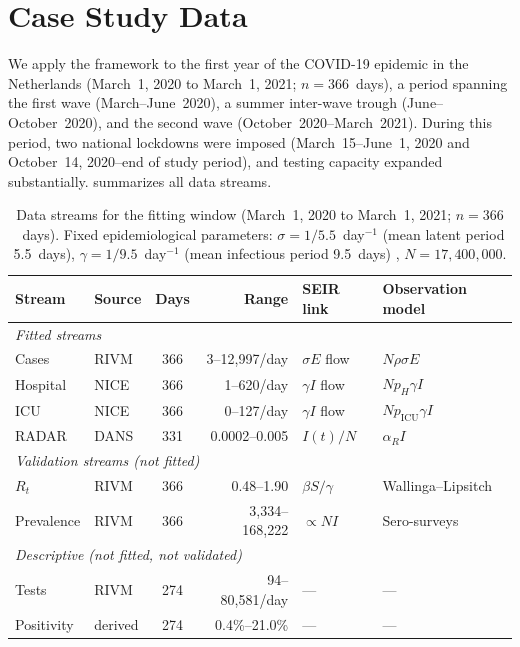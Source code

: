 \documentclass[11pt]{article}
\begin{document}
\section{Case Study Data}\label{sec:data}

We apply the framework to the first year of the COVID-19 epidemic in the Netherlands (March~1, 2020 to March~1, 2021; $n=366$~days), a period spanning the first wave (March--June~2020), a summer inter-wave trough (June--October~2020), and the second wave (October~2020--March~2021). During this period, two national lockdowns were imposed (March~15--June~1, 2020 and October~14, 2020--end of study period), and testing capacity expanded substantially.  summarizes all data streams.

\begin{table}[ht]
\centering\small
\caption{Data streams for the fitting window (March~1, 2020 to March~1, 2021; $n=366$~days). Fixed epidemiological parameters: $\sigma=1/5.5$~day$^{-1}$ (mean latent period 5.5~days), $\gamma=1/9.5$~day$^{-1}$ (mean infectious period 9.5~days) \citep{He2020,Byrne2020}, $N=17{,}400{,}000$.}
\label{tab:data}
\begin{tabular}{llcrll}
\toprule
Stream & Source & Days & Range & SEIR link & Observation model \\
\midrule
\multicolumn{6}{l}{\emph{Fitted streams}} \\
Cases & RIVM & 366 & 3--12{,}997/day & $\sigma E$ flow & $N\rho\sigma E$ \\
Hospital & NICE & 366 & 1--620/day & $\gamma I$ flow & $Np_H\gamma I$ \\
ICU & NICE & 366 & 0--127/day & $\gamma I$ flow & $Np_{\mathrm{ICU}}\gamma I$ \\
RADAR & DANS & 331 & 0.0002--0.005 & $I(t)/N$ & $\alpha_R I$ \\
\midrule
\multicolumn{6}{l}{\emph{Validation streams (not fitted)}} \\
$R_t$ & RIVM & 366 & 0.48--1.90 & $\beta S/\gamma$ & Wallinga--Lipsitch \\
Prevalence & RIVM & 366 & 3{,}334--168{,}222 & $\propto NI$ & Sero-surveys \\
\midrule
\multicolumn{6}{l}{\emph{Descriptive (not fitted, not validated)}} \\
Tests & RIVM & 274 & 94--80{,}581/day & --- & --- \\
Positivity & derived & 274 & 0.4\%--21.0\% & --- & --- \\
\bottomrule
\end{tabular}
\end{table}
\end{document}
